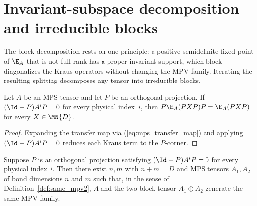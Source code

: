 \section{Invariant-subspace decomposition and irreducible blocks}

The block decomposition rests on one principle: a positive semidefinite fixed
point of $\E_A$ that is not full rank has a proper invariant support, which
block-diagonalizes the Kraus operators without changing the MPV family. Iterating
the resulting splitting decomposes any tensor into irreducible blocks.

\begin{lemma}%
    \label{lem:lower_zero_invariance}
    \leanok
    Let $A$ be an MPS tensor and let $P$ be an orthogonal projection.
    If $(\Id-P)A^iP=0$ for every physical index~$i$, then
    $P\E_A(PXP)P=\E_A(PXP)$ for every $X\in\MN{D}$.
\end{lemma}

\begin{proof}\leanok
    Expanding the transfer map via (\ref{eq:mps_transfer_map}) and applying
    $(\Id-P)A^iP=0$ reduces each Kraus term to the $P$-corner.
\end{proof}


\begin{lemma}\label{thm:lowerzero_two_block}
    \leanok
    Suppose $P$ is an orthogonal projection satisfying
    $(\Id-P)A^iP=0$ for every physical index~$i$.
    Then there exist $n,m$ with $n+m=D$ and MPS tensors $A_1,A_2$ of bond
    dimensions $n$ and $m$ such that, in the sense of
    Definition~\ref{def:same_mpv2}, $A$ and the two-block tensor
    $A_1\oplus A_2$ generate the same MPV family.
\end{lemma}

